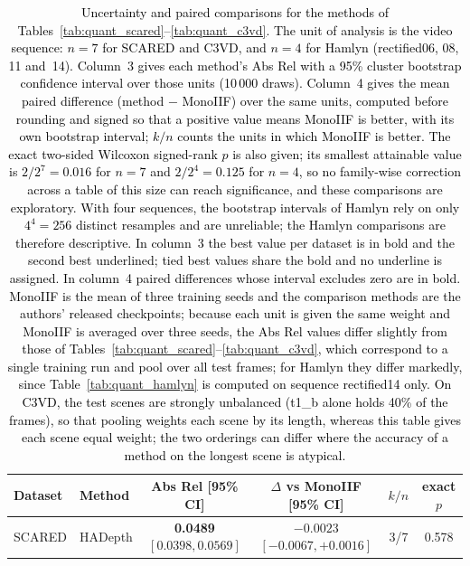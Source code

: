 \documentclass[a4paper,fleqn]{cas-dc}
\newcommand{\rev}{}   %
\begin{document}
{%

\begin{table}[t]
\centering
\rev
\caption{\textcolor{black}{Uncertainty and paired comparisons for the methods of Tables~\ref{tab:quant_scared}--\ref{tab:quant_c3vd}. The unit of analysis is the video sequence: $n=7$ for SCARED and C3VD, and $n=4$ for Hamlyn (rectified06, 08, 11 and~14). Column~3 gives each method's Abs Rel with a 95\% cluster bootstrap confidence interval over those units (10\,000 draws). Column~4 gives the mean paired difference (method $-$ MonoIIF) over the same units, computed before rounding and signed so that a positive value means MonoIIF is better, with its own bootstrap interval; $k/n$ counts the units in which MonoIIF is better. The exact two-sided Wilcoxon signed-rank $p$ is also given; its smallest attainable value is $2/2^{7}=0.016$ for $n=7$ and $2/2^{4}=0.125$ for $n=4$, so no family-wise correction across a table of this size can reach significance, and these comparisons are exploratory. With four sequences, the bootstrap intervals of Hamlyn rely on only $4^4=256$ distinct resamples and are unreliable; the Hamlyn comparisons are therefore descriptive. In column~3 the best value per dataset is in bold and the second best underlined; tied best values share the bold and no underline is assigned. In column~4 paired differences whose interval excludes zero are in bold. MonoIIF is the mean of three training seeds and the comparison methods are the authors' released checkpoints; because each unit is given the same weight and MonoIIF is averaged over three seeds, the Abs Rel values differ slightly from those of Tables~\ref{tab:quant_scared}--\ref{tab:quant_c3vd}, which correspond to a single training run and pool over all test frames; for Hamlyn they differ markedly, since Table~\ref{tab:quant_hamlyn} is computed on sequence rectified14 only. On C3VD, the test scenes are strongly unbalanced (t1\_b alone holds 40\% of the frames), so that pooling weights each scene by its length, whereas this table gives each scene equal weight; the two orderings can differ where the accuracy of a method on the longest scene is atypical.}}
\label{tab:paired-c1}
\small
\begin{tabular}{llcccc}
\toprule
Dataset & Method & Abs Rel [95\% CI] & $\Delta$ vs MonoIIF [95\% CI] & $k/n$ & exact $p$ \\
\midrule
\multirow{6}{*}{SCARED}
 & HADepth            & \textbf{0.0489} $[0.0398, 0.0569]$    & $-0.0023$ $[-0.0067, +0.0016]$          & 3/7   & 0.578 \\

\end{tabular}
\end{table}}
\end{document}
